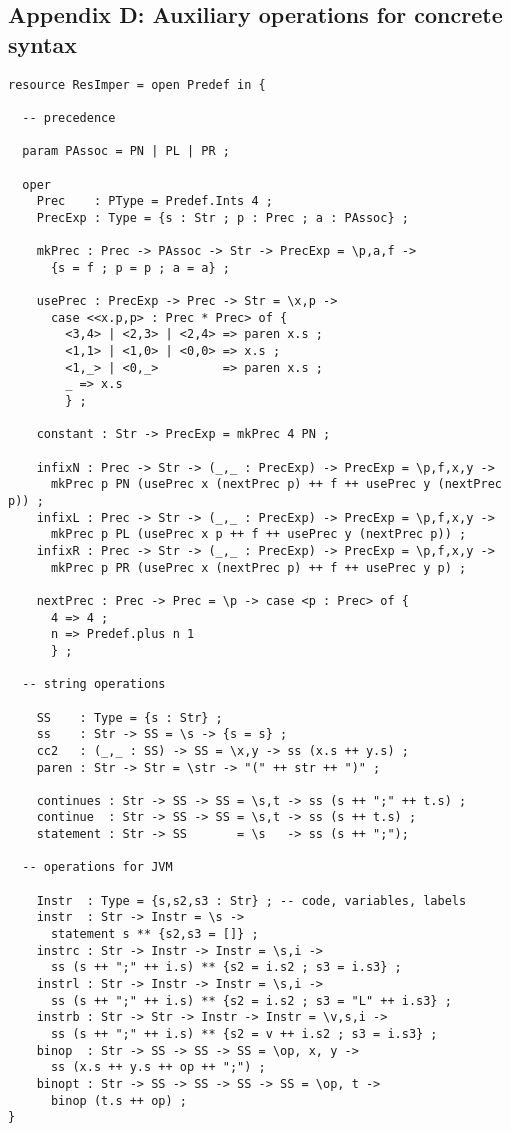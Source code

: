\documentclass[12pt]{article}
\begin{document}
\subsection*{Appendix D: Auxiliary operations for concrete syntax}

\small
\begin{verbatim}
resource ResImper = open Predef in {

  -- precedence

  param PAssoc = PN | PL | PR ;

  oper 
    Prec    : PType = Predef.Ints 4 ;
    PrecExp : Type = {s : Str ; p : Prec ; a : PAssoc} ;

    mkPrec : Prec -> PAssoc -> Str -> PrecExp = \p,a,f -> 
      {s = f ; p = p ; a = a} ;

    usePrec : PrecExp -> Prec -> Str = \x,p ->
      case <<x.p,p> : Prec * Prec> of {
        <3,4> | <2,3> | <2,4> => paren x.s ;
        <1,1> | <1,0> | <0,0> => x.s ;
        <1,_> | <0,_>         => paren x.s ;
        _ => x.s
        } ;

    constant : Str -> PrecExp = mkPrec 4 PN ;

    infixN : Prec -> Str -> (_,_ : PrecExp) -> PrecExp = \p,f,x,y ->
      mkPrec p PN (usePrec x (nextPrec p) ++ f ++ usePrec y (nextPrec p)) ;
    infixL : Prec -> Str -> (_,_ : PrecExp) -> PrecExp = \p,f,x,y ->
      mkPrec p PL (usePrec x p ++ f ++ usePrec y (nextPrec p)) ;
    infixR : Prec -> Str -> (_,_ : PrecExp) -> PrecExp = \p,f,x,y ->
      mkPrec p PR (usePrec x (nextPrec p) ++ f ++ usePrec y p) ;

    nextPrec : Prec -> Prec = \p -> case <p : Prec> of {
      4 => 4 ; 
      n => Predef.plus n 1
      } ;

  -- string operations

    SS    : Type = {s : Str} ;
    ss    : Str -> SS = \s -> {s = s} ;
    cc2   : (_,_ : SS) -> SS = \x,y -> ss (x.s ++ y.s) ;
    paren : Str -> Str = \str -> "(" ++ str ++ ")" ;

    continues : Str -> SS -> SS = \s,t -> ss (s ++ ";" ++ t.s) ; 
    continue  : Str -> SS -> SS = \s,t -> ss (s ++ t.s) ;
    statement : Str -> SS       = \s   -> ss (s ++ ";"); 

  -- operations for JVM

    Instr  : Type = {s,s2,s3 : Str} ; -- code, variables, labels
    instr  : Str -> Instr = \s -> 
      statement s ** {s2,s3 = []} ;
    instrc : Str -> Instr -> Instr = \s,i -> 
      ss (s ++ ";" ++ i.s) ** {s2 = i.s2 ; s3 = i.s3} ;
    instrl : Str -> Instr -> Instr = \s,i -> 
      ss (s ++ ";" ++ i.s) ** {s2 = i.s2 ; s3 = "L" ++ i.s3} ;
    instrb : Str -> Str -> Instr -> Instr = \v,s,i -> 
      ss (s ++ ";" ++ i.s) ** {s2 = v ++ i.s2 ; s3 = i.s3} ;
    binop  : Str -> SS -> SS -> SS = \op, x, y ->
      ss (x.s ++ y.s ++ op ++ ";") ;
    binopt : Str -> SS -> SS -> SS -> SS = \op, t ->
      binop (t.s ++ op) ;
}
\end{verbatim}
\normalsize
\newpage
\end{document}
